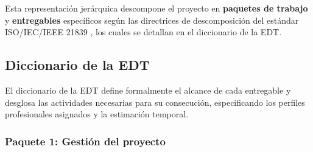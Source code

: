 Esta representación jerárquica descompone el proyecto en \textbf{paquetes de trabajo} y \textbf{entregables} específicos según las directrices de descomposición del estándar ISO/IEC/IEEE 21839 \cite{iso21839}, los cuales se detallan en el diccionario de la EDT.

\subsection{Diccionario de la EDT}\label{subsec:diccionario_edt}

El diccionario de la EDT define formalmente el alcance de cada entregable y desglosa las actividades necesarias para su consecución, especificando los perfiles profesionales asignados y la estimación temporal.

\subsubsection*{Paquete 1: Gestión del proyecto}

